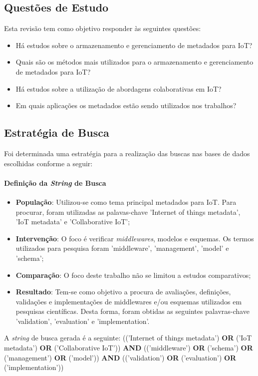 \subsection{Questões de Estudo}
\quad Esta revisão tem como objetivo responder às seguintes questões:
\begin{itemize}
  \item Há estudos sobre o armazenamento e gerenciamento de metadados para \acrlong{IoT}?
  \item Quais são os métodos mais utilizados para o armazenamento e gerenciamento de metadados para \acrshort{IoT}?
  \item Há estudos sobre a utilização de abordagens colaborativas em \acrlong{IoT}?
  \item Em quais aplicações os metadados estão sendo utilizados nos trabalhos?
\end{itemize}

\subsection{Estratégia de Busca}
\quad Foi determinada uma estratégia para a realização das buscas nas bases de dados escolhidas conforme a seguir:

\paragraph{Definição da \textit{String} de Busca}
\begin{itemize}
  \item \textbf{População}: Utilizou-se como tema principal metadados para \acrshort{IoT}. Para procurar, foram utilizadas as palavas-chave 'Internet of things metadata', 'IoT metadata' e 'Collaborative IoT';
  \item \textbf{Intervenção}: O foco é verificar \textit{middlewares}, modelos e esquemas. Os termos utilizados para pesquisa foram 'middleware', 'management', 'model' e 'schema';
  \item \textbf{Comparação}: O foco deste trabalho não se limitou a estudos comparativos;
  \item \textbf{Resultado}: Tem-se como objetivo a procura de avaliações, definições, validações e implementações de middlewares e/ou esquemas utilizados em pesquisas científicas. Desta forma, foram obtidas as seguintes palavras-chave
  'validation', 'evaluation' e 'implementation'.
\end{itemize}

\quad A \textit{string} de busca gerada é a seguinte:
(('Internet of things metadata') \textbf{OR} ('IoT metadata') \textbf{OR} ('Collaborative IoT')) \textbf{AND} (('middleware') \textbf{OR} ('schema') \textbf{OR} ('management') \textbf{OR} ('model')) \textbf{AND} (('validation') \textbf{OR} ('evaluation') \textbf{OR} ('implementation'))

